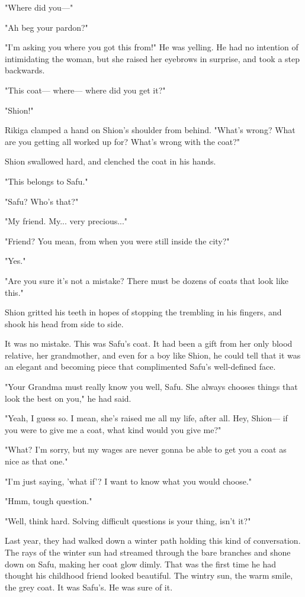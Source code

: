 "Where did you---"

"Ah beg your pardon?"

"I'm asking you where you got this from!" He was yelling. He had no
intention of intimidating the woman, but she raised her eyebrows in
surprise, and took a step backwards.

"This coat--- where--- where did you get it?"

"Shion!"

Rikiga clamped a hand on Shion's shoulder from behind. "What's wrong?
What are you getting all worked up for? What's wrong with the coat?"

Shion swallowed hard, and clenched the coat in his hands.

"This belongs to Safu."

"Safu? Who's that?"

"My friend. My... very precious..."

"Friend? You mean, from when you were still inside the city?"

"Yes."

"Are you sure it's not a mistake? There must be dozens of coats that
look like this."

Shion gritted his teeth in hopes of stopping the trembling in his
fingers, and shook his head from side to side.

It was no mistake. This was Safu's coat. It had been a gift from her
only blood relative, her grandmother, and even for a boy like Shion, he
could tell that it was an elegant and becoming piece that complimented
Safu's well-defined face.

"Your Grandma must really know you well, Safu. She always chooses things
that look the best on you," he had said.

"Yeah, I guess so. I mean, she's raised me all my life, after all. Hey,
Shion--- if you were to give me a coat, what kind would you give me?"

"What? I'm sorry, but my wages are never gonna be able to get you a coat
as nice as that one."

"I'm just saying, 'what if'? I want to know what you would choose."

"Hmm, tough question."

"Well, think hard. Solving difficult questions is your thing, isn't it?"

Last year, they had walked down a winter path holding this kind of
conversation. The rays of the winter sun had streamed through the bare
branches and shone down on Safu, making her coat glow dimly. That was
the first time he had thought his childhood friend looked beautiful. The
wintry sun, the warm smile, the grey coat. It was Safu's. He was sure of
it.


